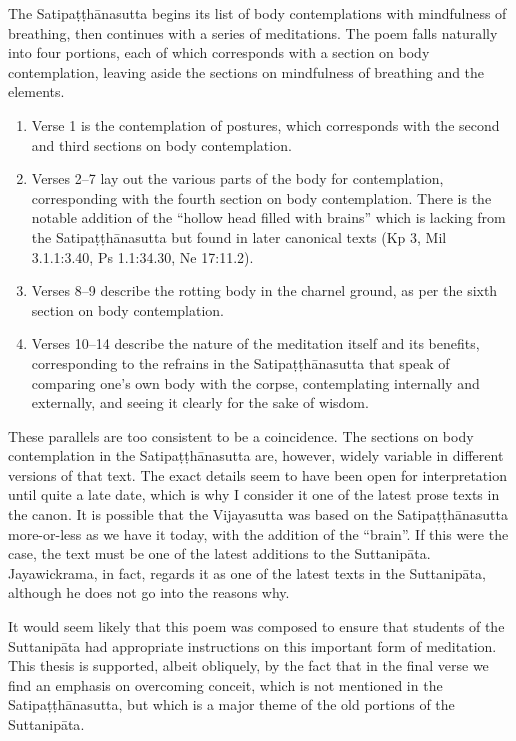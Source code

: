 \documentclass[12pt,openany]{book}%
\begin{document}
The \textsanskrit{Satipaṭṭhānasutta} begins its list of body contemplations with mindfulness of breathing, then continues with a series of meditations. The poem falls naturally into four portions, each of which corresponds with a section on body contemplation, leaving aside the sections on mindfulness of breathing and the elements.

\begin{enumerate}%
\item Verse 1 is the contemplation of postures, which corresponds with the second and third sections on body contemplation.%
\item Verses 2–7 lay out the various parts of the body for contemplation, corresponding with the fourth section on body contemplation. There is the notable addition of the “hollow head filled with brains” which is lacking from the \textsanskrit{Satipaṭṭhānasutta} but found in later canonical texts (Kp 3, Mil 3.1.1:3.40, Ps 1.1:34.30, Ne 17:11.2).%
\item Verses 8–9 describe the rotting body in the charnel ground, as per the sixth section on body contemplation.%
\item Verses 10–14 describe the nature of the meditation itself and its benefits, corresponding to the refrains in the \textsanskrit{Satipaṭṭhānasutta} that speak of comparing one’s own body with the corpse, contemplating internally and externally, and seeing it clearly for the sake of wisdom.%
\end{enumerate}

These parallels are too consistent to be a coincidence. The sections on body contemplation in the \textsanskrit{Satipaṭṭhānasutta} are, however, widely variable in different versions of that text. The exact details seem to have been open for interpretation until quite a late date, which is why I consider it one of the latest prose texts in the canon. It is possible that the Vijayasutta was based on the \textsanskrit{Satipaṭṭhānasutta} more-or-less as we have it today, with the addition of the “brain”. If this were the case, the text must be one of the latest additions to the \textsanskrit{Suttanipāta}. Jayawickrama, in fact, regards it as one of the latest texts in the \textsanskrit{Suttanipāta}, although he does not go into the reasons why.

It would seem likely that this poem was composed to ensure that students of the \textsanskrit{Suttanipāta} had appropriate instructions on this important form of meditation. This thesis is supported, albeit obliquely, by the fact that in the final verse we find an emphasis on overcoming conceit, which is not mentioned in the \textsanskrit{Satipaṭṭhānasutta}, but which is a major theme of the old portions of the \textsanskrit{Suttanipāta}.
\end{document}
